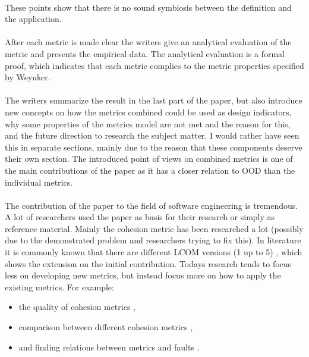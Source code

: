 \paragraph{}
These points show that there is no sound symbiosis between the definition and the application.

\paragraph{}
After each metric is made clear the writers give an analytical evaluation of the metric and presents the empirical
data. The analytical evaluation is a formal proof, which indicates that each metric complies to the metric properties
specified by Weyuker.

\paragraph{}
The writers summarize the result in the last part of the paper, but also introduce new concepts on how the metrics
combined could be used as design indicators, why some properties of the metrics model are not met and the reason for this, and the
future direction to research the subject matter. I would rather have seen this in separate sections, mainly due to the reason that these
components deserve their own section. The introduced point of views on combined metrics is one of the main contributions
of the paper as it has a closer relation to OOD than the individual metrics.

\paragraph{}
The contribution of the paper to the field of software engineering is tremendous. A lot of researchers used the paper
as basis for their research or simply as reference material. Mainly the cohesion metric has been researched a lot (possibly
due to the demonstrated problem and researchers trying to fix this). In literature it is commonly known that there are
different LCOM versions (1 up to 5) \autocite{TOOLS-USA-2003-BadriB04}, which shows the extension on the initial contribution. Todays research
tends to focus less on developing new metrics, but instead focus more on how to apply the existing metrics. For example:

\begin{itemize}
\item the quality of cohesion metrics \autocite{DESOUKY} \autocite{JOHARI},
\item comparison between different cohesion metrics \autocite{JOSHI},
\item and finding relations between metrics and faults \autocite{LU} \autocite{SINGH} \autocite{DALLAL}.
\end{itemize}


